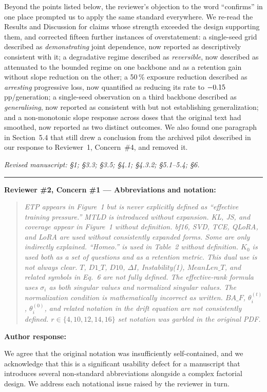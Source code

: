 \documentclass[11pt,a4paper]{article}
\newcommand{\rconcern}[3]{%
  \bigskip\noindent\rule{\linewidth}{0.4pt}\par\medskip
  \noindent\textbf{\textcolor{rccolor}{#1 --- #2:}}\par
  \smallskip
  \begin{quote}\itshape\textcolor{rccolor}{#3}\end{quote}%
}
\newcommand{\arhead}[1]{\medskip\noindent\textbf{#1}\par\smallskip}
\newcommand{\msloc}[1]{%
  \smallskip\noindent\textit{Revised manuscript: #1}\par%
}
\begin{document}
Beyond the points listed below, the reviewer's objection to the word
``confirms'' in one place prompted us to apply the same standard
everywhere. We re-read the Results and Discussion for claims whose
strength exceeded the design supporting them, and corrected fifteen
further instances of overstatement: a single-seed grid described as \emph{demonstrating}
joint dependence, now reported as descriptively consistent with it; a
degradative regime described as \emph{reversible}, now described as
attenuated to the bounded regime on one backbone and as a retention gain
without slope reduction on the other; a 50\,\% exposure reduction
described as \emph{arresting} progressive loss, now quantified as
reducing its rate to $-0.15$\,pp/generation; a single-seed
observation on a third backbone described as \emph{generalising}, now
reported as consistent with but not establishing generalization; and a
non-monotonic slope response across doses that the original text had
smoothed, now reported as two distinct outcomes. We also found one
paragraph in Section~5.4 that still drew a conclusion from the archived
pilot described in our response to Reviewer~1, Concern~\#4, and removed
it.

\msloc{\S1; \S3.3; \S3.5; \S4.1; \S4.3.2;
\S5.1--5.4; \S6.}


\rconcern{Reviewer \#2, Concern \#1}{Abbreviations and notation}{ETP appears in Figure~1 but is never explicitly defined as ``effective training pressure.'' MTLD is introduced without expansion. KL, JS, and coverage appear in Figure~1 without definition. bf16, SVD, TCE, QLoRA, and LoRA are used without consistently expanded forms. Some are only indirectly explained. ``Homeo.'' is used in Table~2 without definition. $K_0$ is used both as a set of questions and as a retention metric. This dual use is not always clear. $T$, $D1\_T$, $D10$, $\Delta I$, Instability(1), $MeanLen\_T$, and related symbols in Eq.~6 are not fully defined. The effective-rank formula uses $\sigma_i$ as both singular values and normalized singular values. The normalization condition is mathematically incorrect as written. $BA\_F$, $\theta_i^{(t)}$, $\theta_i^{(0)}$, and related notation in the drift equation are not consistently defined. $r \in \{4,10,12,14,16\}$ set notation was garbled in the original PDF.}

\arhead{Author response:}

We agree that the original notation was insufficiently self-contained,
and we acknowledge that this is a significant usability defect for a
manuscript that introduces several non-standard abbreviations alongside
a complex factorial design. We address each notational issue raised by
the reviewer in turn.
\end{document}
